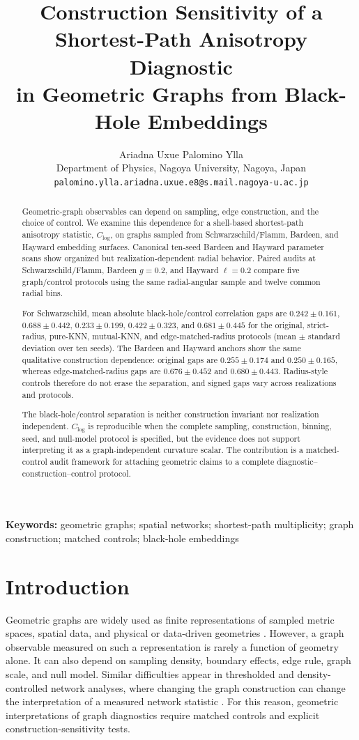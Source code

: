 \documentclass[11pt]{article}
\title{Construction Sensitivity of a Shortest-Path Anisotropy Diagnostic\\
in Geometric Graphs from Black-Hole Embeddings}
\author{Ariadna Uxue Palomino Ylla\\
Department of Physics, Nagoya University, Nagoya, Japan\\
\texttt{palomino.ylla.ariadna.uxue.e8@s.mail.nagoya-u.ac.jp}}
\date{}
\newcommand{\clog}{C_{\log}}
\begin{document}
\maketitle

\begin{abstract}
Geometric-graph observables can depend on sampling, edge construction, and the
choice of control. We examine this dependence for a shell-based shortest-path
anisotropy statistic, $\clog$, on graphs sampled from Schwarzschild/Flamm,
Bardeen, and Hayward embedding surfaces. Canonical ten-seed Bardeen and Hayward
parameter scans show organized but realization-dependent radial behavior.
Paired audits at Schwarzschild/Flamm, Bardeen $g=0.2$, and Hayward $\ell=0.2$
compare five graph/control protocols using the same radial-angular sample and
twelve common radial bins.

For Schwarzschild, mean absolute black-hole/control correlation gaps are
$0.242\pm0.161$, $0.688\pm0.442$, $0.233\pm0.199$,
$0.422\pm0.323$, and $0.681\pm0.445$ for the original, strict-radius,
pure-KNN, mutual-KNN, and edge-matched-radius protocols (mean $\pm$ standard
deviation over ten seeds). The Bardeen and Hayward anchors show the same
qualitative construction dependence: original gaps are $0.255\pm0.174$ and
$0.250\pm0.165$, whereas edge-matched-radius gaps are $0.676\pm0.452$ and
$0.680\pm0.443$. Radius-style controls therefore do not erase the separation,
and signed gaps vary across realizations and protocols.

The black-hole/control separation is neither construction invariant nor
realization independent. $\clog$ is reproducible when the complete sampling,
construction, binning, seed, and null-model protocol is specified, but the
evidence does not support interpreting it as a graph-independent curvature
scalar. The contribution is a matched-control audit framework for attaching
geometric claims to a complete diagnostic--construction--control protocol.
\end{abstract}

\noindent\textbf{Keywords:} geometric graphs; spatial networks; shortest-path multiplicity;
graph construction; matched controls; black-hole embeddings

\section{Introduction}

Geometric graphs are widely used as finite representations of sampled metric
spaces, spatial data, and physical or data-driven geometries
\cite{Penrose2003,DallChristensen2002,Newman2010}. However, a graph observable
measured on such a representation is rarely a function of geometry alone. It can
also depend on sampling density, boundary effects, edge rule, graph scale, and
null model. Similar difficulties appear in thresholded and density-controlled
network analyses, where changing the graph construction can change the
interpretation of a measured network statistic
\cite{VanWijk2010,Langer2013,Ginestet2011}. For this reason, geometric
interpretations of graph diagnostics require matched controls and explicit
construction-sensitivity tests.
\end{document}
